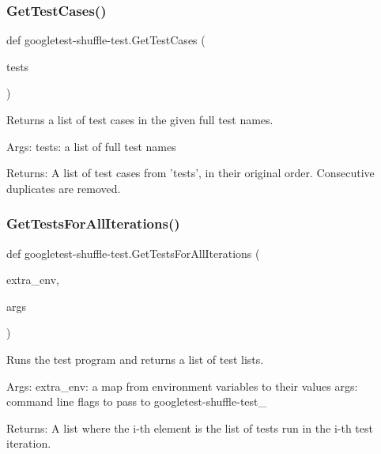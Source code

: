 \mbox{\label{namespacegoogletest-shuffle-test_a81a570a6aadc23957a949f8740c3708d}} 
\subsubsection{\texorpdfstring{GetTestCases()}{GetTestCases()}}
{\footnotesize\ttfamily def googletest-\/shuffle-\/test.\+Get\+Test\+Cases (\begin{DoxyParamCaption}\item[{}]{tests }\end{DoxyParamCaption})}

\begin{DoxyVerb}Returns a list of test cases in the given full test names.

Args:
  tests: a list of full test names

Returns:
  A list of test cases from 'tests', in their original order.
  Consecutive duplicates are removed.
\end{DoxyVerb}
 \mbox{\label{namespacegoogletest-shuffle-test_a4b81c9525e71495e7f512575a3fe436e}} 
\subsubsection{\texorpdfstring{GetTestsForAllIterations()}{GetTestsForAllIterations()}}
{\footnotesize\ttfamily def googletest-\/shuffle-\/test.\+Get\+Tests\+For\+All\+Iterations (\begin{DoxyParamCaption}\item[{}]{extra\+\_\+env,  }\item[{}]{args }\end{DoxyParamCaption})}

\begin{DoxyVerb}Runs the test program and returns a list of test lists.

Args:
  extra_env: a map from environment variables to their values
  args: command line flags to pass to googletest-shuffle-test_

Returns:
  A list where the i-th element is the list of tests run in the i-th
  test iteration.
\end{DoxyVerb}
 \mbox{\label{namespacegoogletest-shuffle-test_aa073a0449ab11c6cccb62249e70bb06f}} 
